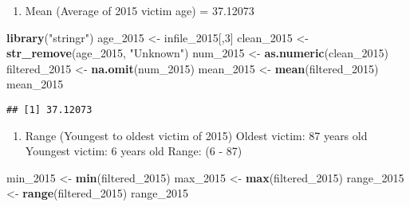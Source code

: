 \documentclass[
]{article}
\newenvironment{Shaded}{\begin{snugshade}}{\end{snugshade}}
\newcommand{\DecValTok}[1]{\textcolor[rgb]{0.00,0.00,0.81}{#1}}
\newcommand{\KeywordTok}[1]{\textcolor[rgb]{0.13,0.29,0.53}{\textbf{#1}}}
\newcommand{\NormalTok}[1]{#1}
\newcommand{\StringTok}[1]{\textcolor[rgb]{0.31,0.60,0.02}{#1}}
\providecommand{\tightlist}{%
  \setlength{\itemsep}{0pt}\setlength{\parskip}{0pt}}
\begin{document}
\begin{enumerate}
\def\labelenumi{\arabic{enumi}.}
\tightlist
\item
  Mean (Average of 2015 victim age) = 37.12073
\end{enumerate}

\begin{Shaded}
\begin{Highlighting}[]
\KeywordTok{library}\NormalTok{(}\StringTok{"stringr"}\NormalTok{)}
\NormalTok{age_}\DecValTok{2015}\NormalTok{ <-}\StringTok{ }\NormalTok{infile_}\DecValTok{2015}\NormalTok{[,}\DecValTok{3}\NormalTok{]}
\NormalTok{clean_}\DecValTok{2015}\NormalTok{ <-}\StringTok{ }\KeywordTok{str_remove}\NormalTok{(age_}\DecValTok{2015}\NormalTok{, }\StringTok{"Unknown"}\NormalTok{)}
\NormalTok{num_}\DecValTok{2015}\NormalTok{ <-}\StringTok{ }\KeywordTok{as.numeric}\NormalTok{(clean_}\DecValTok{2015}\NormalTok{)}
\NormalTok{filtered_}\DecValTok{2015}\NormalTok{ <-}\StringTok{ }\KeywordTok{na.omit}\NormalTok{(num_}\DecValTok{2015}\NormalTok{)}
\NormalTok{mean_}\DecValTok{2015}\NormalTok{ <-}\StringTok{ }\KeywordTok{mean}\NormalTok{(filtered_}\DecValTok{2015}\NormalTok{)}
\NormalTok{mean_}\DecValTok{2015}
\end{Highlighting}
\end{Shaded}

\begin{verbatim}
## [1] 37.12073
\end{verbatim}

\begin{enumerate}
\def\labelenumi{\arabic{enumi}.}
\setcounter{enumi}{1}
\tightlist
\item
  Range (Youngest to oldest victim of 2015) Oldest victim: 87 years old
  Youngest victim: 6 years old Range: (6 - 87)
\end{enumerate}

\begin{Shaded}
\begin{Highlighting}[]
\NormalTok{min_}\DecValTok{2015}\NormalTok{ <-}\StringTok{ }\KeywordTok{min}\NormalTok{(filtered_}\DecValTok{2015}\NormalTok{)}
\NormalTok{max_}\DecValTok{2015}\NormalTok{ <-}\StringTok{ }\KeywordTok{max}\NormalTok{(filtered_}\DecValTok{2015}\NormalTok{)}
\NormalTok{range_}\DecValTok{2015}\NormalTok{ <-}\StringTok{ }\KeywordTok{range}\NormalTok{(filtered_}\DecValTok{2015}\NormalTok{)}
\NormalTok{range_}\DecValTok{2015}
\end{Highlighting}
\end{Shaded}
\end{document}
